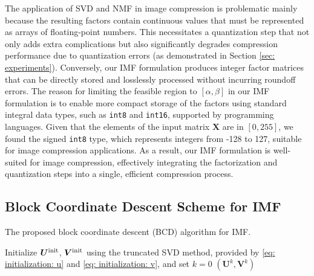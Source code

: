 The application of SVD and NMF in image compression is problematic mainly because the resulting factors contain continuous values that must be represented as arrays of floating-point numbers. This necessitates a quantization step that not only adds extra complications but also significantly degrades compression performance due to quantization errors (as demonstrated in Section \ref{sec: experiments}). Conversely, our IMF formulation produces integer factor matrices that can be directly stored and losslessly processed without incurring roundoff errors. The reason for limiting the feasible region to $[\alpha,\beta]$ in our IMF formulation is to enable more compact storage of the factors using standard integral data types, such as \texttt{int8} and \texttt{int16}, supported by programming languages. Given that the elements of the input matrix $\bm{X}$ are in $[0, 255]$, we found the signed \texttt{int8} type, which represents integers from -128 to 127, suitable for image compression applications. As a result, our IMF formulation is well-suited for image compression, effectively integrating the factorization and quantization steps into a single, efficient compression process.


\subsection{Block Coordinate Descent Scheme for IMF} \label{sec: bcd}

\begin{algorithm}[!t]
	\caption{The proposed block coordinate descent (BCD) algorithm for IMF. \label{alg: bcd for imf}}
	\DontPrintSemicolon
	\SetAlgoLined
	Initialize $\bm{U}^{\rm init}$, $\bm{V}^{\rm init}$ using the truncated SVD method, provided by \eqref{eq: initialization: u} and \eqref{eq: initialization: v}, and set $k=0$\;
	\Return $(\bm{U}^k, \bm{V}^k)$
\end{algorithm}

